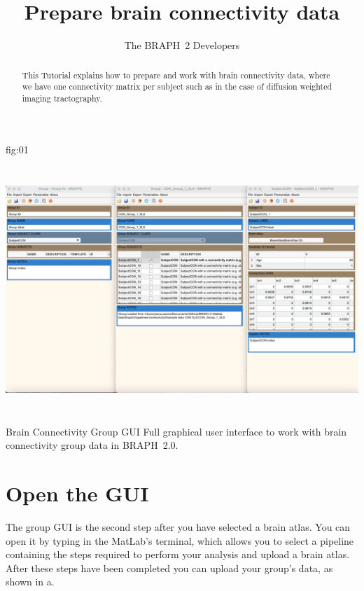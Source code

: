 \documentclass[justified]{tufte-handout}
\title{Prepare brain connectivity data}
\author[The BRAPH~2 Developers]{The BRAPH~2 Developers}
\begin{document}
\maketitle

\begin{abstract}
\noindent
This Tutorial explains how to prepare and work with brain connectivity data, where we have one connectivity matrix per subject such as in the case of diffusion weighted imaging tractography. 
\end{abstract}

\tableofcontents

	{fig:01}
	{\includegraphics[height=10cm]{fig01.png}}
	{Brain Connectivity Group GUI}
	{
	Full graphical user interface to work with brain connectivity group data in BRAPH~2.0. 
	}

\clearpage
\section{Open the GUI}

The group GUI is the second step after you have selected a brain atlas. You can open it by typing  in the MatLab's terminal, which allows you to select a pipeline containing the steps required to perform your analysis and upload a brain atlas. After these steps have been completed you can upload your group's data, as shown in a.
\end{document}
